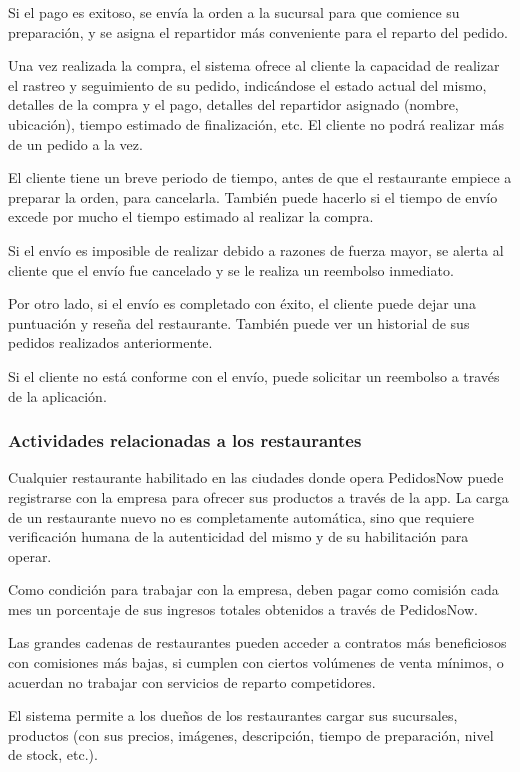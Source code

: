 Si el pago es exitoso, se envía la orden a la sucursal para que comience su preparación, y se asigna el repartidor más conveniente para el reparto del pedido.

Una vez realizada la compra, el sistema ofrece al cliente la capacidad de realizar el rastreo y seguimiento de su pedido, indicándose el estado actual del mismo, detalles de la compra y el pago, detalles del repartidor asignado (nombre, ubicación), tiempo estimado de finalización, etc. El cliente no podrá realizar más de un pedido a la vez.

El cliente tiene un breve periodo de tiempo, antes de que el restaurante empiece a preparar la orden, para cancelarla. También puede hacerlo si el tiempo de envío excede por mucho el tiempo estimado al realizar la compra.

Si el envío es imposible de realizar debido a razones de fuerza mayor, se alerta al cliente que el envío fue cancelado y se le realiza un reembolso inmediato.

Por otro lado, si el envío es completado con éxito, el cliente puede dejar una puntuación y reseña del restaurante. También puede ver un historial de sus pedidos realizados anteriormente.

Si el cliente no está conforme con el envío, puede solicitar un reembolso a través de la aplicación.

\subsubsection{Actividades relacionadas a los restaurantes}

Cualquier restaurante habilitado en las ciudades donde opera PedidosNow puede registrarse con la empresa para ofrecer sus productos a través de la app. La carga de un restaurante nuevo no es completamente automática, sino que requiere verificación humana de la autenticidad del mismo y de su habilitación para operar.

Como condición para trabajar con la empresa, deben pagar como comisión cada mes un porcentaje de sus ingresos totales obtenidos a través de PedidosNow.

Las grandes cadenas de restaurantes pueden acceder a contratos más beneficiosos con comisiones más bajas, si cumplen con ciertos volúmenes de venta mínimos, o acuerdan no trabajar con servicios de reparto competidores.

El sistema permite a los dueños de los restaurantes cargar sus sucursales, productos (con sus precios, imágenes, descripción, tiempo de preparación, nivel de stock, etc.).

